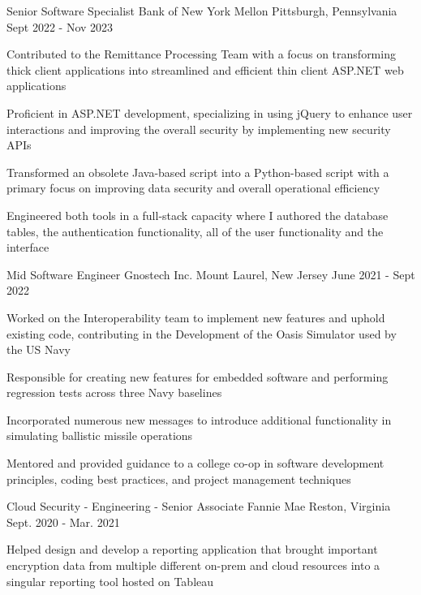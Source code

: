 \begin{cventries}
  \cventry
    {Senior Software Specialist}
    {Bank of New York Mellon}
    {Pittsburgh, Pennsylvania}
    {Sept 2022 - Nov 2023}
    {
      \begin{cvitems}
        \item {Contributed to the Remittance Processing Team with a focus on transforming thick client applications into streamlined and efficient thin client ASP.NET web applications}
        \item {Proficient in ASP.NET development, specializing in using jQuery to enhance user interactions and improving the overall security by implementing new security APIs}
        \item {Transformed an obsolete Java-based script into a Python-based script with a primary focus on improving data security and overall operational efficiency}
        \item {Engineered both tools in a full-stack capacity where I authored the database tables, the authentication functionality, all of the user functionality and the interface}
      \end{cvitems}
    }
  \cventry
    {Mid Software Engineer}
    {Gnostech Inc.}
    {Mount Laurel, New Jersey}
    {June 2021 - Sept 2022}
    {
      \begin{cvitems}
        \item {Worked on the Interoperability team to implement new features and uphold existing code, contributing in the Development of the Oasis Simulator used by the US Navy}
        \item {Responsible for creating new features for embedded software and performing regression tests across three Navy baselines}
        \item {Incorporated numerous new messages to introduce additional functionality in simulating ballistic missile operations}
        \item {Mentored and provided guidance to a college co-op in software development principles, coding best practices, and project management techniques}
      \end{cvitems}
    }
  \cventry
    {Cloud Security - Engineering - Senior Associate}
    {Fannie Mae}
    {Reston, Virginia}
    {Sept. 2020 - Mar. 2021}
    {
      \begin{cvitems}
        \item {Helped design and develop a reporting application that brought important encryption data from multiple different on-prem and cloud resources into a singular reporting tool hosted on Tableau}

\end{cvitems}}
\end{cventries}
